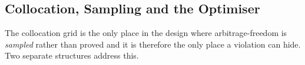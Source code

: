 



\vspace{-0.4cm}



\subsection{Collocation, Sampling and the Optimiser}
\label{subsec:collocation}

\vspace{-0.4cm}


The collocation grid is the only place in the design where arbitrage-freedom is \emph{sampled} rather
than proved  and it is therefore the only place a violation can hide. Two separate structures address
this.

